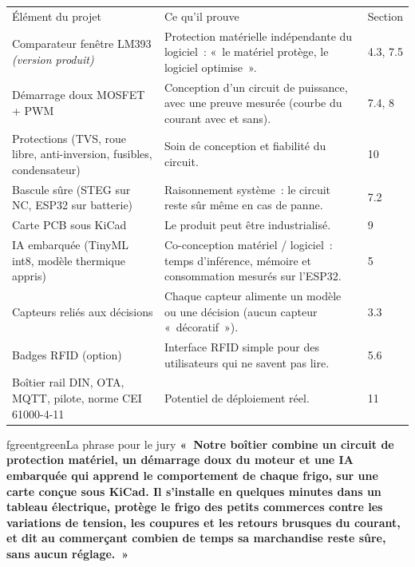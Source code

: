 \documentclass[10pt,a4paper]{article}
\begin{document}
\begin{tabularx}{\linewidth}{Q{4cm}LP{1.6cm}}
 Élément du projet & \mdseries Ce qu'il prouve & \mdseries Section \\
Comparateur fenêtre LM393 \textit{(version produit)} & Protection matérielle indépendante du logiciel~: «~le matériel protège, le logiciel optimise~». & 4.3, 7.5 \\
Démarrage doux MOSFET + PWM & Conception d'un circuit de puissance, avec une preuve mesurée (courbe du courant avec et sans). & 7.4, 8 \\
Protections (TVS, roue libre, anti-inversion, fusibles, condensateur) & Soin de conception et fiabilité du circuit. & 10 \\
Bascule sûre (STEG sur NC, ESP32 sur batterie) & Raisonnement système~: le circuit reste sûr même en cas de panne. & 7.2 \\
Carte PCB sous KiCad & Le produit peut être industrialisé. & 9 \\
IA embarquée (TinyML int8, modèle thermique appris) & Co-conception matériel / logiciel~: temps d'inférence, mémoire et consommation mesurés sur l'ESP32. & 5 \\
Capteurs reliés aux décisions & Chaque capteur alimente un modèle ou une décision (aucun capteur «~décoratif~»). & 3.3 \\
Badges RFID (option) & Interface RFID simple pour des utilisateurs qui ne savent pas lire. & 5.6 \\
Boîtier rail DIN, OTA, MQTT, pilote, norme CEI 61000-4-11 & Potentiel de déploiement réel. & 11 \\
\end{tabularx}

\begin{tbox}{fgreen}{tgreen}{La phrase pour le jury}
\textbf{«~Notre boîtier combine un circuit de protection matériel, un démarrage doux du moteur et une IA embarquée qui apprend le comportement de chaque frigo, sur une carte conçue sous KiCad. Il s'installe en quelques minutes dans un tableau électrique, protège le frigo des petits commerces contre les variations de tension, les coupures et les retours brusques du courant, et dit au commerçant combien de temps sa marchandise reste sûre, sans aucun réglage.~»}
\end{tbox}
\end{document}
